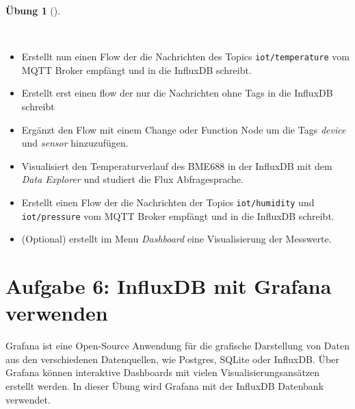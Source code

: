 \documentclass[
  11pt,
  a4paperpaper,
  oneside, openany  ,captions=tableheading
]{scrbook}
\providecommand{\tightlist}{%
  \setlength{\itemsep}{0pt}\setlength{\parskip}{0pt}}
\theoremstyle{definition}
\newtheorem{exercise}{Übung}[chapter]
\theoremstyle{remark}
\begin{document}
\begin{exercise}[]\protect\hypertarget{exr-nodered-influxb}{}\label{exr-nodered-influxb}

~

\begin{itemize}
\tightlist
\item
  Erstellt nun einen Flow der die Nachrichten des Topics
  \texttt{iot/temperature} vom MQTT Broker empfängt und in die InfluxDB
  schreibt.
\item
  Erstellt erst einen flow der nur die Nachrichten ohne Tags in die
  InfluxDB schreibt
\item
  Ergänzt den Flow mit einem Change oder Function Node um die Tags
  \emph{device} und \emph{sensor} hinzuzufügen.
\item
  Visualisiert den Temperaturverlauf des BME688 in der InfluxDB mit dem
  \emph{Data Explorer} und studiert die Flux Abfragesprache.
\item
  Erstellt einen Flow der die Nachrichten der Topics
  \texttt{iot/humidity} und \texttt{iot/pressure} vom MQTT Broker
  empfängt und in die InfluxDB schreibt.
\item
  (Optional) erstellt im Menu \emph{Dashboard} eine Visualisierung der
  Messwerte.
\end{itemize}

\end{exercise}

\section{Aufgabe 6: InfluxDB mit Grafana
verwenden}\label{aufgabe-6-influxdb-mit-grafana-verwenden}

Grafana ist eine Open-Source Anwendung für die grafische Darstellung von
Daten aus den verschiedenen Datenquellen, wie Postgres, SQLite oder
InfluxDB. Über Grafana können interaktive Dashboards mit vielen
Visualisierungsansätzen erstellt werden. In dieser Übung wird Grafana
mit der InfluxDB Datenbank verwendet.
\end{document}
